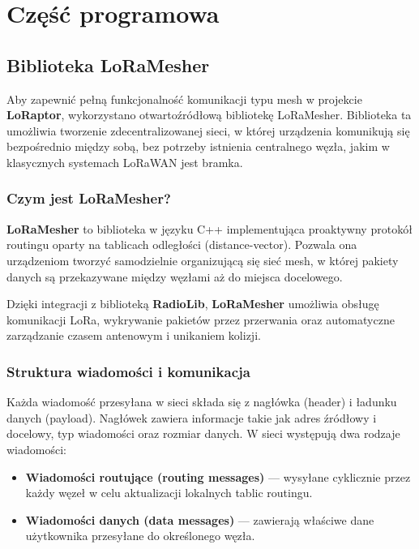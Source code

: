 \section{Część programowa}

\subsection{Biblioteka LoRaMesher}

Aby zapewnić pełną funkcjonalność komunikacji typu mesh w projekcie \textbf{LoRaptor}, wykorzystano otwartoźródłową bibliotekę LoRaMesher. Biblioteka ta umożliwia tworzenie zdecentralizowanej sieci, w której urządzenia komunikują się bezpośrednio między sobą, bez potrzeby istnienia centralnego węzła, jakim w klasycznych systemach LoRaWAN jest bramka.

\subsubsection{Czym jest LoRaMesher?}

\textbf{LoRaMesher} to biblioteka w języku C++ implementująca proaktywny protokół routingu oparty na tablicach odległości (distance-vector). Pozwala ona urządzeniom tworzyć samodzielnie organizującą się sieć mesh, w której pakiety danych są przekazywane między węzłami aż do miejsca docelowego.

Dzięki integracji z biblioteką \textbf{RadioLib}, \textbf{LoRaMesher} umożliwia obsługę komunikacji LoRa, wykrywanie pakietów przez przerwania oraz automatyczne zarządzanie czasem antenowym i unikaniem kolizji.

\clearpage
\subsubsection{Struktura wiadomości i komunikacja}

Każda wiadomość przesyłana w sieci składa się z nagłówka (header) i ładunku danych (payload). Nagłówek zawiera informacje takie jak adres źródłowy i docelowy, typ wiadomości oraz rozmiar danych. W sieci występują dwa rodzaje wiadomości:

\begin{itemize}
	\item \textbf{Wiadomości routujące (routing messages)} — wysyłane cyklicznie przez każdy węzeł w celu aktualizacji lokalnych tablic routingu.
	\item \textbf{Wiadomości danych (data messages)} — zawierają właściwe dane użytkownika przesyłane do określonego węzła.
\end{itemize}

